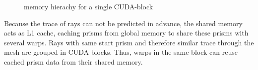 \begin{figure}[H]
  \centerline
  {}
  \caption{memory hierachy for a single CUDA-block}
  \label{graphic:memory_hierarchy}
\end{figure}
Because the trace of rays can not be predicted in advance,
the shared memory acts as L1 cache, caching
prisms from global memory to share these prisms 
with several warps.
Rays with same start prism and therefore similar trace through 
the mesh are grouped in CUDA-blocks. Thus, warps in the same block can 
reuse cached prism data from their shared memory.

